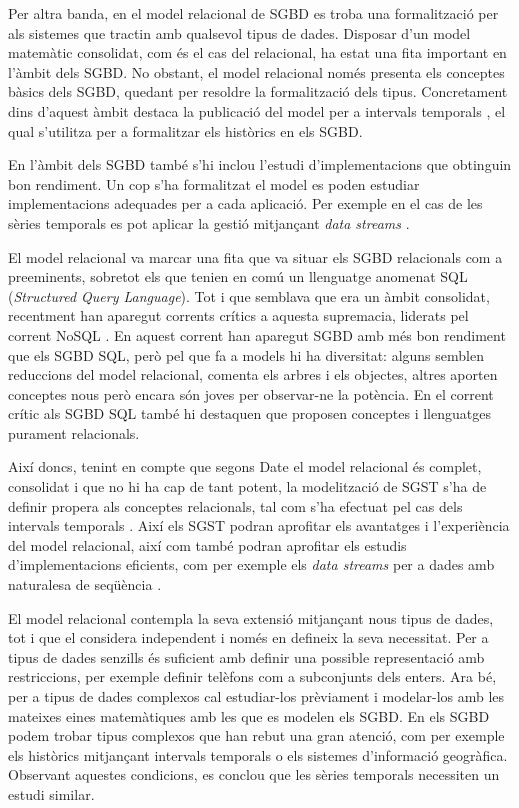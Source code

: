 Per altra banda, en el model relacional de SGBD es troba una
formalització per als sistemes que tractin amb qualsevol tipus de
dades. Disposar d'un model matemàtic consolidat, com és el cas del
relacional, ha estat una fita important en l'àmbit dels SGBD.  No
obstant, el model relacional només presenta els conceptes bàsics dels
SGBD, quedant per resoldre la formalització dels tipus. Concretament
dins d'aquest àmbit destaca la publicació del model per a intervals
temporals \parencite{date02:_tempor_data_relat_model}, el qual
s'utilitza per a formalitzar els històrics en els SGBD.

En l'àmbit dels SGBD també s'hi inclou l'estudi d'implementacions que
obtinguin bon rendiment. Un cop s'ha formalitzat el model es poden
estudiar implementacions adequades per a cada aplicació. Per exemple
en el cas de les sèries temporals es pot aplicar la gestió mitjançant
\emph{data streams} \parencite{babcock02}.


El model relacional va marcar una fita que va situar els SGBD
relacionals com a preeminents, sobretot els que tenien en comú un
llenguatge anomenat SQL (\emph{Structured Query Language}). Tot i que
semblava que era un àmbit consolidat, recentment han aparegut corrents
crítics a aquesta supremacia, liderats pel corrent
NoSQL \parencite{edlich:nosql,stonebraker10}.  En aquest corrent han
aparegut SGBD amb més bon rendiment que els SGBD SQL, però pel que fa
a models hi ha diversitat: alguns semblen reduccions del model
relacional, \textcite[cap.~14,27]{date06} comenta els arbres i els
objectes, altres aporten conceptes nous però encara són joves per
observar-ne la potència. En el corrent crític als SGBD SQL també hi
destaquen \textcite{date:thethirdmanifesto} que proposen conceptes i
llenguatges purament relacionals.




Així doncs, tenint en compte que segons Date el model relacional és
complet, consolidat i que no hi ha cap de tant potent, la modelització
de SGST s'ha de definir propera als conceptes relacionals, tal com
s'ha efectuat pel cas dels intervals
temporals \parencite{date02:_tempor_data_relat_model}. Així els SGST
podran aprofitar els avantatges i l'experiència del model relacional,
així com també podran aprofitar els estudis d'implementacions
eficients, com per exemple els \emph{data streams} per a dades amb
naturalesa de seqüència \parencite{bai05}.

El model relacional contempla la seva extensió mitjançant nous tipus
de dades, tot i que el considera independent i només en defineix la
seva necessitat. Per a tipus de dades senzills és suficient amb
definir una possible representació amb restriccions, per exemple
definir telèfons com a subconjunts dels enters. Ara bé, per a tipus de
dades complexos cal estudiar-los prèviament i modelar-los amb les
mateixes eines matemàtiques amb les que es modelen els SGBD.  En els
SGBD podem trobar tipus complexos que han rebut una gran atenció, com
per exemple els històrics mitjançant intervals temporals o els
sistemes d'informació geogràfica. Observant aquestes condicions, es
conclou que les sèries temporals necessiten un estudi similar.











